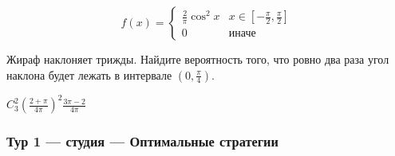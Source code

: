 \begin{enumerate}
\begin{problem}
\[
f(x) = \begin{cases}
\frac{2}{\pi} \cos^2 x & x \in \left[-\frac{\pi}{2}, \frac{\pi}{2}\right] \\
0 & \text{иначе}
\end{cases}
\]

Жираф наклоняет трижды. Найдите вероятность того, что ровно два раза угол наклона будет лежать в интервале $\left(0, \frac{\pi}{4}\right)$.

\begin{sol}
$C_3^2 \left(\frac{2+\pi}{4\pi}\right)^2 \frac{3\pi-2}{4\pi}$
\end{sol}
\end{problem}
\end{enumerate}


\newpage
\subsubsection{Тур 1 — студия — Оптимальные стратегии}


